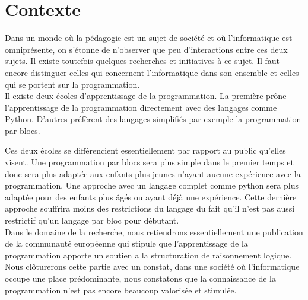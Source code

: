 \section{Contexte}
\label{intro-context}
Dans un monde où la pédagogie est un sujet de société et où l'informatique est omniprésente, on s'étonne de n'observer que peu d'interactions entre ces deux sujets. Il existe toutefois quelques recherches et initiatives à ce sujet. Il faut encore distinguer celles qui concernent l'informatique dans son ensemble et celles qui se portent sur la programmation.\\

Il existe deux écoles d'apprentissage de la programmation. La première prône l'apprentissage de la programmation directement avec des langages comme Python. D'autres préfèrent des langages simplifiés par exemple la programmation par blocs. 

Ces deux écoles se différencient essentiellement par rapport au public qu'elles visent. Une programmation par blocs sera plus simple dans le premier temps et donc sera plus adaptée aux enfants plus jeunes n'ayant aucune expérience avec la programmation. Une approche avec un langage complet comme python sera plus adaptée pour des enfants plus âgés ou ayant déjà une expérience. Cette dernière approche souffrira moins des restrictions du langage du fait qu'il n'est pas aussi restrictif qu'un langage par bloc pour débutant.\\


Dans le domaine de la recherche, nous retiendrons essentiellement une publication de la communauté européenne qui stipule que l'apprentissage de la programmation apporte un soutien a la structuration de raisonnement logique.\\ %

Nous clôturerons cette partie avec un constat, dans une société où l'informatique occupe une place prédominante, nous constatons que la connaissance de la programmation n'est pas encore beaucoup valorisée et stimulée.  %
